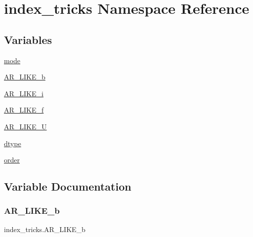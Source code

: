 \hypertarget{namespaceindex__tricks}{}\section{index\+\_\+tricks Namespace Reference}
\label{namespaceindex__tricks}
\subsection*{Variables}
\begin{DoxyCompactItemize}
\item 
\hyperlink{namespaceindex__tricks_a6a874992c809c4d97320ce00642848ea}{mode}
\item 
\hyperlink{namespaceindex__tricks_a3387d5e1331b231d2060109aaa1e0dba}{A\+R\+\_\+\+L\+I\+K\+E\+\_\+b}
\item 
\hyperlink{namespaceindex__tricks_a932c44ac3c96879c3666ac4d110110d2}{A\+R\+\_\+\+L\+I\+K\+E\+\_\+i}
\item 
\hyperlink{namespaceindex__tricks_a4a3e4a9197dffb04f7708586f7311856}{A\+R\+\_\+\+L\+I\+K\+E\+\_\+f}
\item 
\hyperlink{namespaceindex__tricks_aa9f3261ee62eeda9931f19e51c230ebe}{A\+R\+\_\+\+L\+I\+K\+E\+\_\+U}
\item 
\hyperlink{namespaceindex__tricks_aa82295b8f8c96a1e40713a170d4e3c05}{dtype}
\item 
\hyperlink{namespaceindex__tricks_a6024c3c891853d62228e2fa681344b55}{order}
\end{DoxyCompactItemize}


\subsection{Variable Documentation}
\mbox{\label{namespaceindex__tricks_a3387d5e1331b231d2060109aaa1e0dba}} 
\subsubsection{\texorpdfstring{A\+R\+\_\+\+L\+I\+K\+E\+\_\+b}{AR\_LIKE\_b}}
{\footnotesize\ttfamily index\+\_\+tricks.\+A\+R\+\_\+\+L\+I\+K\+E\+\_\+b}

\mbox{\label{namespaceindex__tricks_a4a3e4a9197dffb04f7708586f7311856}} 
